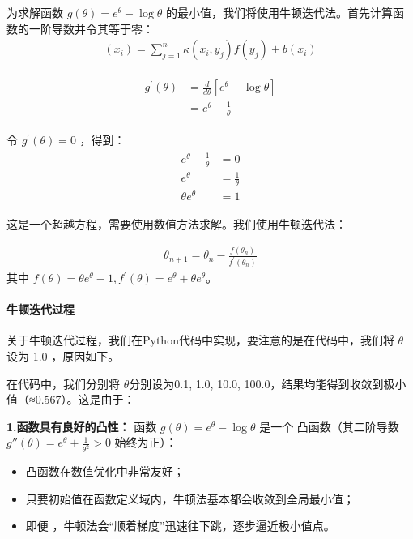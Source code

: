 \documentclass{MMCStyle}
\begin{document}
        
为求解函数 $g(\theta)=e^\theta-\log\theta
$ 的最小值，我们将使用牛顿迭代法。首先计算函数的一阶导数并令其等于零：
\begin{eqnarray} 
(x_i)=\sum_{j=1}^n\kappa(x_i,y_j)f(y_j)+b(x_i)
\end{eqnarray}

\begin{eqnarray} 
\begin{aligned}g^{\prime}(\theta)&=\frac{d}{d\theta}[e^{\theta}-\log\theta]\\&=e^{\theta}-\frac{1}{\theta}\end{aligned}
\end{eqnarray}


令 $g^{\prime}(\theta)=0$  ，得到：
\begin{eqnarray}
    \begin{aligned}e^\theta-\frac{1}{\theta}&=0\\e^\theta&=\frac{1}{\theta}\\\theta e^\theta&=1\end{aligned}
\end{eqnarray}

这是一个超越方程，需要使用数值方法求解。我们使用牛顿迭代法：

    \begin{eqnarray} 
    \theta_{n+1}=\theta_{n}-\frac{f(\theta_{n})}{f^{\prime}(\theta_{n})}
    \end{eqnarray}
其中 $f(\theta)=\theta e^{\theta}-1,f^{\prime}(\theta)=e^{\theta}+\theta e^{\theta}$。        
	\paragraph{牛顿迭代过程}

    
关于牛顿迭代过程，我们在Python代码中实现，要注意的是在代码中，我们将 $\theta$ 设为 1.0 ，原因如下。



在代码中，我们分别将 $\theta$分别设为0.1, 1.0, 10.0, 100.0，结果均能得到收敛到极小值（\theta≈0.567）。这是由于：


\textbf{1.函数具有良好的凸性：}
函数 $g(\theta)=e^\theta-\log\theta$ 是一个 凸函数（其二阶导数 $g''(\theta) = e^\theta + \frac{1}{\theta^2} > 0$ 始终为正）：
\begin{itemize}
    \item  凸函数在数值优化中非常友好；
    \item 只要初始值在函数定义域内，牛顿法基本都会收敛到全局最小值；
    \item   即便 ，牛顿法会“顺着梯度”迅速往下跳，逐步逼近极小值点。
\end{itemize}
\end{document}
